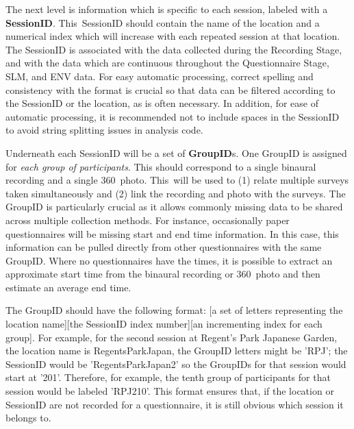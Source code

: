      The next level is information which is specific to each session, labeled with a \textbf{SessionID}. This~SessionID should contain the name of the location and a numerical index which will increase with each repeated session at that location. The SessionID is associated with the data collected during the Recording Stage, and with the data which are continuous throughout the Questionnaire Stage, SLM, and ENV data. For easy automatic processing, correct spelling and consistency with the format is crucial so that data can be filtered according to the SessionID or the location, as is often necessary. In addition,  for ease of automatic processing, it is recommended not to include spaces in the SessionID to avoid string splitting issues in analysis code.

     Underneath each SessionID will be a set of \textbf{GroupID}s. One GroupID is assigned for \textit{each group of participants}. This should correspond to a single binaural recording and a single 360\degree~photo. This~will be used to (1) relate multiple surveys taken simultaneously and (2) link the recording and photo with the surveys. The GroupID is particularly crucial as it allows commonly missing data to be shared across multiple collection methods. For instance, occasionally paper questionnaires will be missing start and end time information. In this case, this information can be pulled directly from other questionnaires with the same GroupID. Where no questionnaires have the times, it is possible to extract an approximate start time from the binaural recording or 360\degree~photo and then estimate an average end time.

     The GroupID should have the following format: [a set of letters representing the location name][the SessionID index number][an incrementing index for each group]. For example, for the second session at Regent's Park Japanese Garden, the location name is RegentsParkJapan, the GroupID letters might be 'RPJ'; the SessionID would be 'RegentsParkJapan2' so the GroupIDs for that session would start at '201'. Therefore, for example, the tenth group of participants for that session would be labeled 'RPJ210'. This format ensures that, if the location or SessionID are not recorded for a questionnaire, it is still obvious which session it belongs to.


